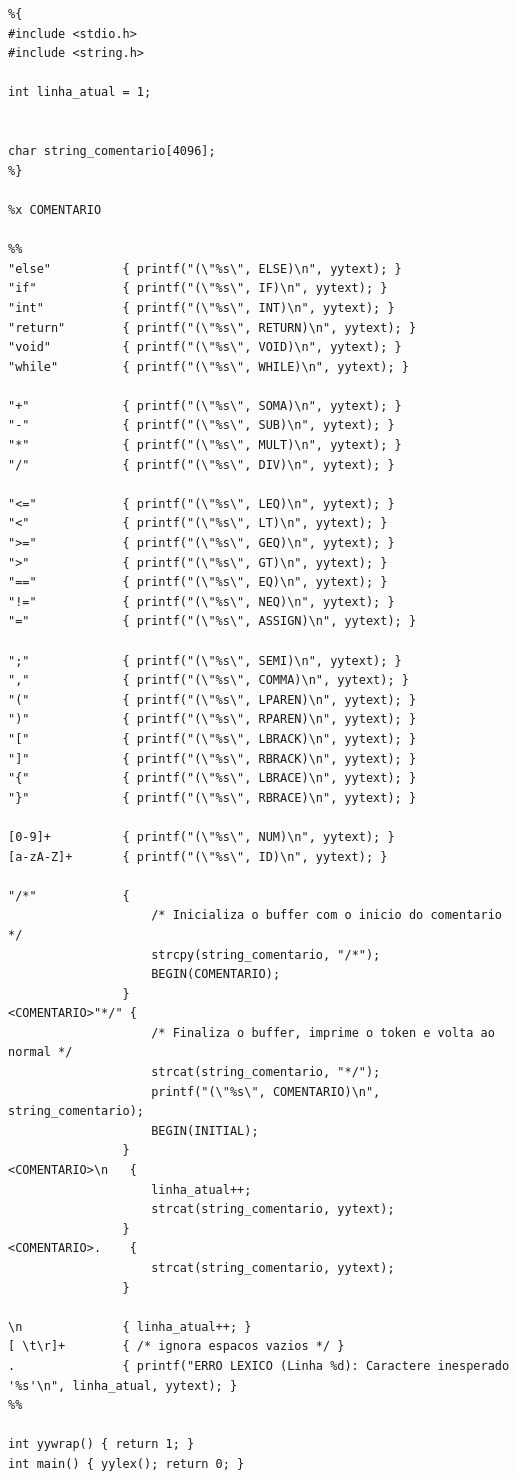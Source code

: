 \documentclass[12pt]{article}
\begin{document}
\begin{lstlisting}
%{
#include <stdio.h>
#include <string.h>

int linha_atual = 1;


char string_comentario[4096];
%}

%x COMENTARIO

%%
"else"          { printf("(\"%s\", ELSE)\n", yytext); }
"if"            { printf("(\"%s\", IF)\n", yytext); }
"int"           { printf("(\"%s\", INT)\n", yytext); }
"return"        { printf("(\"%s\", RETURN)\n", yytext); }
"void"          { printf("(\"%s\", VOID)\n", yytext); }
"while"         { printf("(\"%s\", WHILE)\n", yytext); }

"+"             { printf("(\"%s\", SOMA)\n", yytext); }
"-"             { printf("(\"%s\", SUB)\n", yytext); }
"*"             { printf("(\"%s\", MULT)\n", yytext); }
"/"             { printf("(\"%s\", DIV)\n", yytext); }

"<="            { printf("(\"%s\", LEQ)\n", yytext); }
"<"             { printf("(\"%s\", LT)\n", yytext); }
">="            { printf("(\"%s\", GEQ)\n", yytext); }
">"             { printf("(\"%s\", GT)\n", yytext); }
"=="            { printf("(\"%s\", EQ)\n", yytext); }
"!="            { printf("(\"%s\", NEQ)\n", yytext); }
"="             { printf("(\"%s\", ASSIGN)\n", yytext); }

";"             { printf("(\"%s\", SEMI)\n", yytext); }
","             { printf("(\"%s\", COMMA)\n", yytext); }
"("             { printf("(\"%s\", LPAREN)\n", yytext); }
")"             { printf("(\"%s\", RPAREN)\n", yytext); }
"["             { printf("(\"%s\", LBRACK)\n", yytext); }
"]"             { printf("(\"%s\", RBRACK)\n", yytext); }
"{"             { printf("(\"%s\", LBRACE)\n", yytext); }
"}"             { printf("(\"%s\", RBRACE)\n", yytext); }

[0-9]+          { printf("(\"%s\", NUM)\n", yytext); }
[a-zA-Z]+       { printf("(\"%s\", ID)\n", yytext); }

"/*"            {
                    /* Inicializa o buffer com o inicio do comentario */
                    strcpy(string_comentario, "/*");
                    BEGIN(COMENTARIO);
                }
<COMENTARIO>"*/" {
                    /* Finaliza o buffer, imprime o token e volta ao normal */
                    strcat(string_comentario, "*/");
                    printf("(\"%s\", COMENTARIO)\n", string_comentario);
                    BEGIN(INITIAL);
                }
<COMENTARIO>\n   {
                    linha_atual++;
                    strcat(string_comentario, yytext);
                }
<COMENTARIO>.    {
                    strcat(string_comentario, yytext);
                }

\n              { linha_atual++; }
[ \t\r]+        { /* ignora espacos vazios */ }
.               { printf("ERRO LEXICO (Linha %d): Caractere inesperado '%s'\n", linha_atual, yytext); }
%%

int yywrap() { return 1; }
int main() { yylex(); return 0; }
\end{lstlisting}
\end{document}
